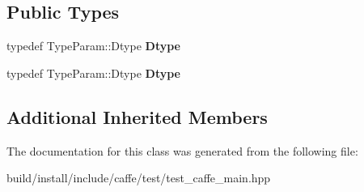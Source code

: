 \subsection*{Public Types}
\begin{DoxyCompactItemize}
\item 
\mbox{\label{classcaffe_1_1_multi_device_test_a00027850d58f75824c1f33b450c99fb7}} 
typedef Type\+Param\+::\+Dtype {\bfseries Dtype}
\item 
\mbox{\label{classcaffe_1_1_multi_device_test_a00027850d58f75824c1f33b450c99fb7}} 
typedef Type\+Param\+::\+Dtype {\bfseries Dtype}
\end{DoxyCompactItemize}
\subsection*{Additional Inherited Members}


The documentation for this class was generated from the following file\+:\begin{DoxyCompactItemize}
\item 
build/install/include/caffe/test/test\+\_\+caffe\+\_\+main.\+hpp\end{DoxyCompactItemize}
